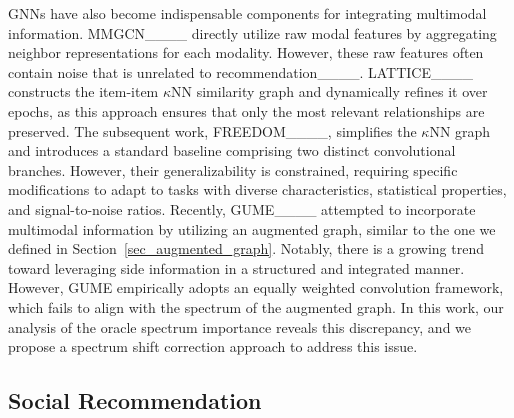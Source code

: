 GNNs have also become indispensable components for integrating multimodal information.
MMGCN____ directly utilize raw modal features by aggregating neighbor representations for each modality.
However, these raw features often contain noise that is unrelated to recommendation____.
LATTICE____ constructs the item-item $\kappa$NN similarity graph and dynamically refines it over epochs, 
as this approach ensures that only the most relevant relationships are preserved.
The subsequent work, FREEDOM____, 
simplifies the $\kappa$NN graph and introduces a standard baseline comprising two distinct convolutional branches.
However, their generalizability is constrained, 
requiring specific modifications to adapt to tasks with diverse characteristics, statistical properties, and signal-to-noise ratios.
Recently, GUME____ attempted to incorporate multimodal information by utilizing an augmented graph, 
similar to the one we defined in Section~\ref{sec_augmented_graph}. 
Notably, there is a growing trend toward leveraging side information in a structured and integrated manner. 
However, GUME empirically adopts an equally weighted convolution framework, 
which fails to align with the spectrum of the augmented graph. 
In this work, our analysis of the oracle spectrum importance reveals this discrepancy, 
and we propose a spectrum shift correction approach to address this issue.



\subsection{Social Recommendation}

